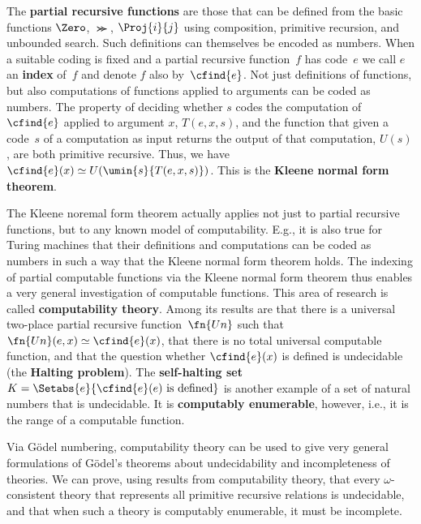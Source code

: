 The \textbf{partial recursive functions} are those that can be defined
from the basic functions $\Zero$, $\Succ$, $\Proj{i}{j}$ using
composition, primitive recursion, and unbounded search. Such
definitions can themselves be encoded as numbers. When a suitable
coding is fixed and a partial recursive function~$f$ has code~$e$ we
call $e$ an \textbf{index} of~$f$ and denote $f$ also by~$\cfind{e}$.
Not just definitions of functions, but also computations of functions
applied to arguments can be coded as numbers. The property of deciding
whether $s$ codes the computation of $\cfind{e}$ applied to argument
$x$, $T(e, x, s)$, and the function that given a code~$s$ of a
computation as input returns the output of that computation, $U(s)$,
are both primitive recursive. Thus, we have $\cfind{e}(x) \simeq
U(\umin{s}{T(e,x,s)})$. This is the \textbf{Kleene normal form
theorem}.

The Kleene noremal form theorem actually applies not just to partial
recursive functions, but to any known model of computability. E.g., it
is also true for Turing machines that their definitions and
computations can be coded as numbers in such a way that the Kleene
normal form theorem holds. The indexing of partial computable
functions via the Kleene normal form theorem thus enables a very
general investigation of computable functions. This area of research is
called \textbf{computability theory}. Among its results are that there
is a universal two-place partial recursive function~$\fn{Un}$ such
that $\fn{Un}(e,x) \simeq \cfind{e}(x)$, that there is no total
universal computable function, and that the question whether
$\cfind{e}(x)$ is defined is undecidable (the \textbf{Halting
problem}). The \textbf{self-halting set}~$K = \Setabs{e}{\cfind{e}(e)
\text{ is defined}}$ is another example of a set of natural numbers
that is undecidable. It is \textbf{computably enumerable}, however,
i.e., it is the range of a computable function.

Via G\"odel numbering, computability theory can be used to give very
general formulations of G\"odel's theorems about undecidability and
incompleteness of theories. We can prove, using results from
computability theory, that every $\omega$-consistent theory that
represents all primitive recursive relations is undecidable, and that
when such a theory is computably enumerable, it must be incomplete.